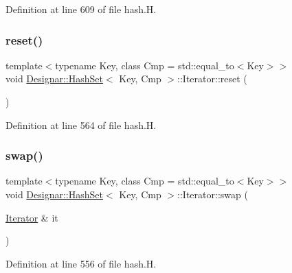 Definition at line 609 of file hash.\+H.

\mbox{\label{class_designar_1_1_hash_set_1_1_iterator_a4563f0da2eaf8dc2b4879cc959f7c277}} 
\subsubsection{\texorpdfstring{reset()}{reset()}}
{\footnotesize\ttfamily template$<$typename Key, class Cmp = std\+::equal\+\_\+to$<$\+Key$>$$>$ \\
void \hyperlink{class_designar_1_1_hash_set}{Designar\+::\+Hash\+Set}$<$ Key, Cmp $>$\+::Iterator\+::reset (\begin{DoxyParamCaption}{ }\end{DoxyParamCaption})\hspace{0.3cm}{\ttfamily [inline]}}



Definition at line 564 of file hash.\+H.

\mbox{\label{class_designar_1_1_hash_set_1_1_iterator_a5849b111320c33206baef1926cb3f156}} 
\subsubsection{\texorpdfstring{swap()}{swap()}}
{\footnotesize\ttfamily template$<$typename Key, class Cmp = std\+::equal\+\_\+to$<$\+Key$>$$>$ \\
void \hyperlink{class_designar_1_1_hash_set}{Designar\+::\+Hash\+Set}$<$ Key, Cmp $>$\+::Iterator\+::swap (\begin{DoxyParamCaption}\item[{\hyperlink{class_designar_1_1_hash_set_1_1_iterator}{Iterator} \&}]{it }\end{DoxyParamCaption})\hspace{0.3cm}{\ttfamily [inline]}}



Definition at line 556 of file hash.\+H.



